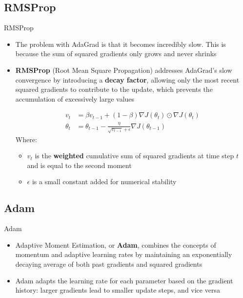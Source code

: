 \documentclass[serif, aspectratio=169]{beamer}
\begin{document}
\subsection{RMSProp}
\begin{frame}{RMSProp}
    \begin{itemize}
        \item The problem with AdaGrad is that it becomes incredibly slow. This is because the sum of squared gradients only grows and never shrinks
        \item \textbf{RMSProp} (Root Mean Square Propagation) addresses AdaGrad's slow convergence by introducing a \textbf{decay factor}, allowing only the most recent squared gradients to contribute to the update, which prevents the accumulation of excessively large values

        \begin{align*}
        v_t &= \beta v_{t-1} + (1 - \beta) \nabla J(\theta_t) \odot \nabla J(\theta_t) \\
        \theta_{t} &= \theta_{t-1}- \frac{\eta}{\sqrt{v_{t-1}} + \epsilon} \nabla J(\theta_{t-1})
        \end{align*}
        Where:
        \begin{itemize}
            \item $v_t$ is the \textbf{weighted} cumulative sum of squared gradients at time step $t$ and is equal to the second moment
            \item $\epsilon$ is a small constant added for numerical stability
        \end{itemize}
    \end{itemize}
\end{frame}

\subsection{Adam}
\begin{frame}{Adam}
    \begin{itemize}
        \item Adaptive Moment Estimation, or \textbf{Adam}, combines the concepts of momentum and adaptive learning rates by maintaining an exponentially decaying average of both past gradients and squared gradients
        \item Adam adapts the learning rate for each parameter based on the gradient history: larger gradients lead to smaller update steps, and vice versa
    \end{itemize}
\end{frame}
\end{document}
